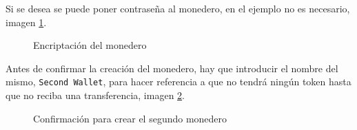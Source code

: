 Si se desea se puede poner contraseña al monedero, en el ejemplo no es necesario, imagen \ref{fig:wallet-16}.

\begin{figure}[H]
	\centering
	\caption{Encriptación del monedero}
	\label{fig:wallet-16}
\end{figure}

\newpage

Antes de confirmar la creación del monedero, hay que introducir el nombre del mismo, \texttt{Second Wallet}, para hacer referencia a que no tendrá ningún token hasta que no reciba una transferencia, imagen \ref{fig:wallet-17}.

\begin{figure}[H]
	\centering
	\caption{Confirmación para crear el segundo monedero}
	\label{fig:wallet-17}
\end{figure}

















